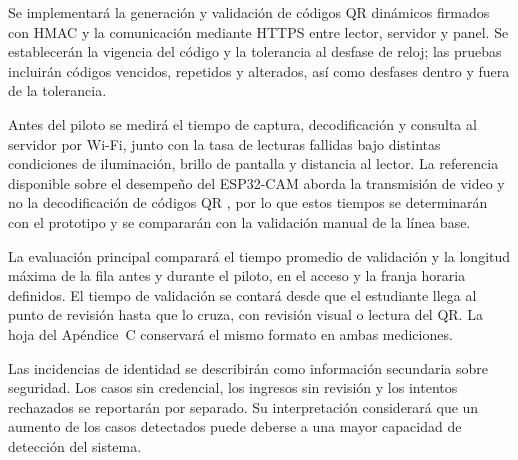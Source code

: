 Se implementará la generación y validación de códigos QR dinámicos firmados
con HMAC \parencite{subpratatsavee2015hmac} y la comunicación mediante HTTPS
entre lector, servidor y panel. Se establecerán la vigencia del código y la
tolerancia al desfase de reloj; las pruebas incluirán códigos vencidos,
repetidos y alterados, así como desfases dentro y fuera de la tolerancia.

Antes del piloto se medirá el tiempo de captura, decodificación y consulta
al servidor por Wi-Fi, junto con la tasa de lecturas fallidas bajo distintas
condiciones de iluminación, brillo de pantalla y distancia al lector. La
referencia disponible sobre el desempeño del ESP32-CAM aborda la transmisión
de video y no la decodificación de códigos QR \parencite{nowroz2025esp32cam},
por lo que estos tiempos se determinarán con el prototipo y se compararán
con la validación manual de la línea base.

La evaluación principal comparará el tiempo promedio de validación y la
longitud máxima de la fila antes y durante el piloto, en el acceso y la
franja horaria definidos. El tiempo de validación se contará desde que el
estudiante llega al punto de revisión hasta que lo cruza, con revisión
visual o lectura del QR. La hoja del Apéndice~C conservará el mismo formato
en ambas mediciones.

Las incidencias de identidad se describirán como información secundaria
sobre seguridad. Los casos sin credencial, los ingresos sin revisión y los
intentos rechazados se reportarán por separado. Su interpretación
considerará que un aumento de los casos detectados puede deberse a una mayor
capacidad de detección del sistema.
